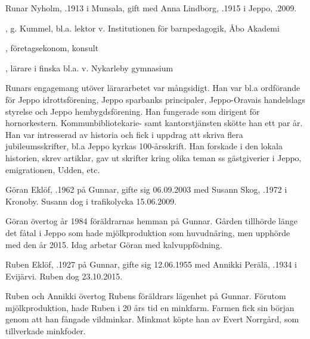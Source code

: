 Runar Nyholm, .1913 i Munsala, gift med Anna Lindborg, .1915 i Jeppo, .2009.
\begin{jhchildren}
  \item {}, g. Kummel, bl.a. lektor v. Institutionen för barnpedagogik, Åbo Akademi
  \item {}, företagsekonom, konsult
  \item {},  lärare i finska bl.a. v. Nykarleby gymnasium
\end{jhchildren}
Runars engagemang utöver lärararbetet var mångsidigt. Han var bl.a ordförande för  Jeppo idrottsförening, Jeppo sparbanks principaler, Jeppo-Oravais handelslags styrelse och Jeppo hembygdsförening. Han fungerade som dirigent för hornorkestern. Kommunbibliotekarie- samt kantorstjänsten skötte han ett par år. Han var intresserad av historia och fick i uppdrag att skriva flera jubileumsskrifter, bl.a Jeppo kyrkas 100-årsskrift. Han forskade i den lokala historien, skrev artiklar, gav ut skrifter kring olika teman ss gästgiverier i Jeppo, emigrationen, Udden, etc.




Göran Eklöf, .1962 på Gunnar, gifte sig 06.09.2003 med Susann Skog, .1972 i Kronoby. Susann dog i trafikolycka 15.06.2009.
\begin{jhchildren}
  \item {}
  \item {}
\end{jhchildren}
Göran övertog år 1984  föräldrarnas hemman på Gunnar. Gården tillhörde länge det fåtal i Jeppo som hade mjölkproduktion som huvudnäring, men upphörde med den år 2015. Idag arbetar Göran med kalvuppfödning.


Ruben Eklöf,  .1927 på Gunnar, gifte sig 12.06.1955 med Annikki  Perälä,  .1934 i Evijärvi. Ruben dog 23.10.2015.
\begin{jhchildren}
  \item {}
  \item {}
\end{jhchildren}
Ruben och Annikki övertog Rubens föräldrars lägenhet på Gunnar. Förutom mjölkproduktion, hade Ruben i 20 års tid en minkfarm. Farmen fick sin början genom att han fångade vildminkar. Minkmat köpte han av Evert Norrgård, som tillverkade minkfoder.


